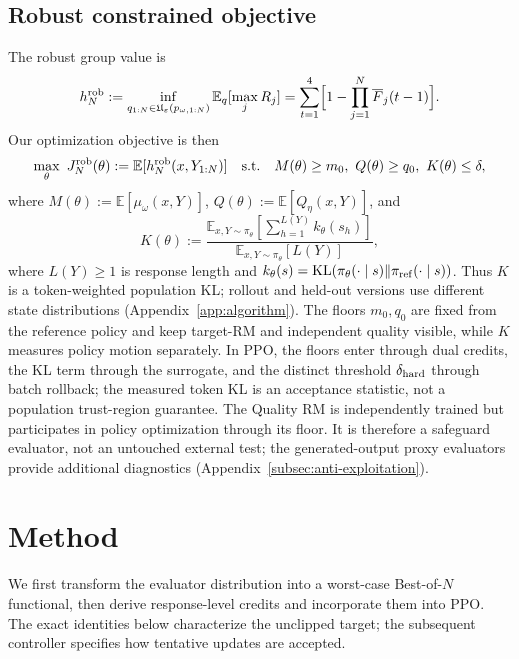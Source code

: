 \documentclass{article}
\theoremstyle{definition}
\theoremstyle{remark}
\begin{document}
\subsection{Robust constrained objective}
The robust group value is
\begin{equation}
\label{eq:robust-group-value}
h_N^{\rm rob}
:=\inf_{q_{1:N}\in\mathfrak U_{\varepsilon}(p_{\omega,1:N})}
\mathbb E_q[\max_jR_j]
=\sum_{t=1}^{4}\Bigl[1-\prod_{j=1}^{N}\overline F_j(t-1)\Bigr].
\end{equation}
Our optimization objective is then
\begin{equation}
\label{eq:robust-max-closed}
\max_{\theta}\ J_N^{\rm rob}(\theta)
:=\mathbb E[h_N^{\rm rob}(x,Y_{1:N})]
\quad\text{s.t.}\quad
M(\theta)\ge m_0,\ Q(\theta)\ge q_0,\ K(\theta)\le\delta,
\end{equation}
where
\(M(\theta):=\mathbb E[\mu_\omega(x,Y)]\),
\(Q(\theta):=\mathbb E[Q_\eta(x,Y)]\), and
\[
K(\theta):=\frac{\mathbb E_{x,Y\sim\pi_\theta}[\sum_{h=1}^{L(Y)}k_\theta(s_h)]}
{\mathbb E_{x,Y\sim\pi_\theta}[L(Y)]},
\]
where \(L(Y)\ge1\) is response length and
\(k_\theta(s)=\mathrm{KL}(\pi_\theta(\cdot\mid s)\Vert\pi_{\rm ref}(\cdot\mid s))\).
Thus \(K\) is a token-weighted population KL; rollout and held-out versions
use different state distributions (Appendix~\ref{app:algorithm}).
The floors \(m_0,q_0\) are fixed from the reference policy and keep target-RM
and independent quality visible, while \(K\) measures policy motion separately.
In PPO, the floors enter through dual credits, the KL term through the
surrogate, and the distinct threshold \(\delta_{\rm hard}\) through batch
rollback; the measured token KL is an acceptance statistic, not a population
trust-region guarantee.  The Quality RM is independently trained but participates in policy optimization
through its floor. It is therefore a safeguard evaluator, not an untouched
external test; the generated-output proxy evaluators provide additional
diagnostics (Appendix~\ref{subsec:anti-exploitation}).

\section{Method}
\label{sec:method}

We first transform the evaluator distribution into a worst-case Best-of-\(N\)
functional, then derive response-level credits and incorporate them into PPO.
The exact identities below characterize the unclipped target; the subsequent
controller specifies how tentative updates are accepted.
\end{document}
